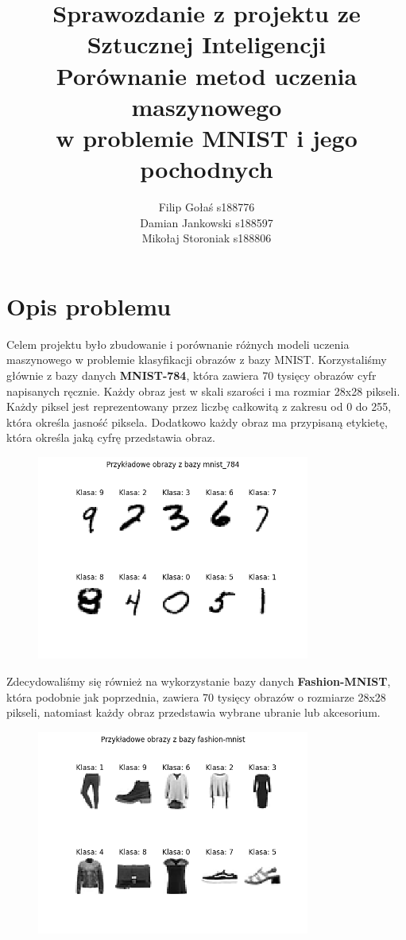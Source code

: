 \documentclass{article}
\title{Sprawozdanie z projektu ze Sztucznej Inteligencji \\ 
Porównanie metod uczenia maszynowego \\ 
w problemie MNIST i jego pochodnych}
\author{Filip Gołaś s188776 \\ Damian Jankowski s188597 \\ Mikołaj Storoniak s188806}
\begin{document}
\maketitle

\tableofcontents

\section{Opis problemu}

Celem projektu było zbudowanie i porównanie różnych
modeli uczenia maszynowego w problemie klasyfikacji
obrazów z bazy MNIST. Korzystaliśmy głównie z bazy
danych \textbf{MNIST-784}, która zawiera 70 tysięcy obrazów
cyfr napisanych ręcznie. Każdy obraz jest w skali
szarości i ma rozmiar 28x28 pikseli. Każdy piksel
jest reprezentowany przez liczbę całkowitą z zakresu
od 0 do 255, która określa jasność piksela. Dodatkowo
każdy obraz ma przypisaną etykietę, która określa
jaką cyfrę przedstawia obraz.

\begin{figure}[H]
    \centering
    \includegraphics[width=0.8\textwidth]{baza_mnist_784.png}
\end{figure}

Zdecydowaliśmy się również na wykorzystanie bazy
danych \textbf{Fashion-MNIST}, która podobnie jak poprzednia, zawiera
70 tysięcy obrazów o rozmiarze 28x28 pikseli, natomiast
każdy obraz przedstawia wybrane ubranie lub akcesorium.

\begin{figure}[H]
    \centering
    \includegraphics[width=0.8\textwidth]{baza_fashion_mnist.png}
\end{figure}
\end{document}
